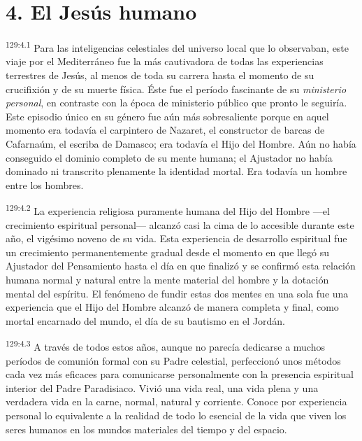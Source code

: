 \section*{4. El Jesús humano}
\par
\textsuperscript{129:4.1} Para las inteligencias celestiales del universo local que lo observaban, este viaje por el Mediterráneo fue la más cautivadora de todas las experiencias terrestres de Jesús, al menos de toda su carrera hasta el momento de su crucifixión y de su muerte física. Éste fue el período fascinante de su \textit{ministerio personal}, en contraste con la época de ministerio público que pronto le seguiría. Este episodio único en su género fue aún más sobresaliente porque en aquel momento era todavía el carpintero de Nazaret, el constructor de barcas de Cafarnaúm, el escriba de Damasco; era todavía el Hijo del Hombre. Aún no había conseguido el dominio completo de su mente humana; el Ajustador no había dominado ni transcrito plenamente la identidad mortal. Era todavía un hombre entre los hombres.

\par
\textsuperscript{129:4.2} La experiencia religiosa puramente humana del Hijo del Hombre ---el crecimiento espiritual personal--- alcanzó casi la cima de lo accesible durante este año, el vigésimo noveno de su vida. Esta experiencia de desarrollo espiritual fue un crecimiento permanentemente gradual desde el momento en que llegó su Ajustador del Pensamiento hasta el día en que finalizó y se confirmó esta relación humana normal y natural entre la mente material del hombre y la dotación mental del espíritu. El fenómeno de fundir estas dos mentes en una sola fue una experiencia que el Hijo del Hombre alcanzó de manera completa y final, como mortal encarnado del mundo, el día de su bautismo en el Jordán.

\par
\textsuperscript{129:4.3} A través de todos estos años, aunque no parecía dedicarse a muchos períodos de comunión formal con su Padre celestial, perfeccionó unos métodos cada vez más eficaces para comunicarse personalmente con la presencia espiritual interior del Padre Paradisiaco. Vivió una vida real, una vida plena y una verdadera vida en la carne, normal, natural y corriente. Conoce por experiencia personal lo equivalente a la realidad de todo lo esencial de la vida que viven los seres humanos en los mundos materiales del tiempo y del espacio.

